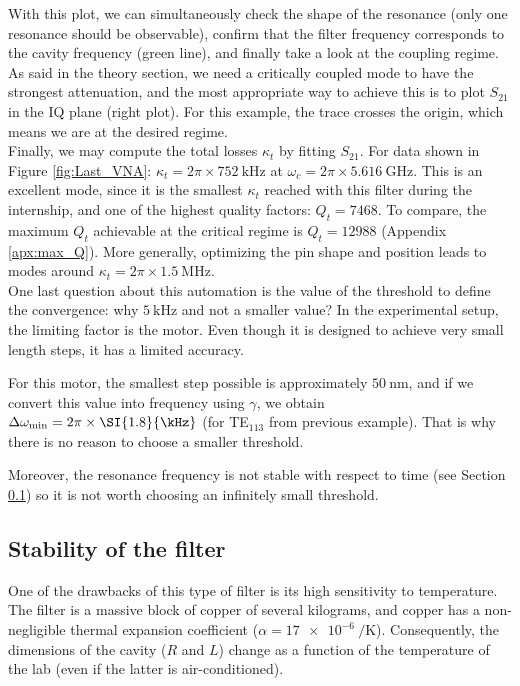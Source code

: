 \documentclass[11pt,a4pape,longbibliography]{article}
\begin{document}
With this plot, we can simultaneously check the shape of the resonance (only one resonance should be observable), confirm that the filter frequency corresponds to the cavity frequency (green line), and finally take a look at the coupling regime. As said in the theory section, we need a critically coupled mode to have the strongest attenuation, and the most appropriate way to achieve this is to plot $S_{21}$ in the IQ plane (right plot). For this example, the trace crosses the origin, which means we are at the desired regime.\\

Finally, we may compute the total losses $\kappa_t$ by fitting $S_{21}$. For data shown in Figure \ref{fig:Last_VNA}: $\kappa_t=2\pi\times\SI{752}{\kHz}$ at $\omega_c=2\pi\times\SI{5.616}{\GHz}$. This is an excellent mode, since it is the smallest $\kappa_t$ reached with this filter during the internship, and one of the highest quality factors: $Q_t=7468$. To compare, the maximum $Q_t$ achievable at the critical regime is $Q_t=12988$ (Appendix \ref{apx:max_Q}). More generally, optimizing the pin shape and position leads to modes around $\kappa_t=2\pi\times\SI{1.5}{\MHz}$.\\ 

One last question about this automation is the value of the threshold to define the convergence: why $\SI{5}{\kHz}$ and not a smaller value? In the experimental setup, the limiting factor is the motor. Even though it is designed to achieve very small length steps, it has a limited accuracy.

For this motor, the smallest step possible is approximately $\SI{50}{\nm}$, and if we convert this value into frequency using $\gamma$, we obtain $\Delta\omega_{\rm{min}}=2\pi\times\SI{1.8}{\kHz}$ (for TE$_{113}$ from previous example). That is why there is no reason to choose a smaller threshold. 

Moreover, the resonance frequency is not stable with respect to time (see Section \ref{sec:evolution}) so it is not worth choosing an infinitely small threshold.

\subsection{Stability of the filter}
\label{sec:evolution}

One of the drawbacks of this type of filter is its high sensitivity to temperature. The filter is a massive block of copper of several kilograms, and copper has a non-negligible thermal expansion coefficient ($\alpha=\SI{17e-6}{\per\kelvin}$). Consequently, the dimensions of the cavity ($R$ and $L$) change as a function of the temperature of the lab (even if the latter is air-conditioned).
\end{document}
